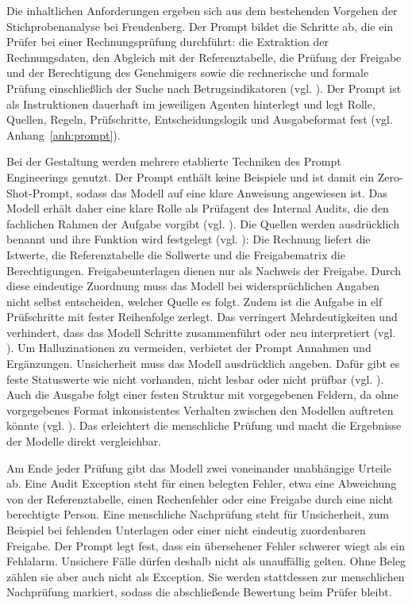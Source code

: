 Die inhaltlichen Anforderungen ergeben sich aus dem bestehenden Vorgehen der Stichprobenanalyse bei Freudenberg. Der Prompt bildet die Schritte ab, die ein Prüfer bei einer Rechnungsprüfung durchführt: die Extraktion der Rechnungsdaten, den Abgleich mit der Referenztabelle, die Prüfung der Freigabe und der Berechtigung des Genehmigers sowie die rechnerische und formale Prüfung einschließlich der Suche nach Betrugsindikatoren (vgl. \cite{freudenberg2026auditsample}). Der Prompt ist als Instruktionen dauerhaft im jeweiligen Agenten hinterlegt und legt Rolle, Quellen, Regeln, Prüfschritte, Entscheidungslogik und Ausgabeformat fest (vgl. Anhang~\ref{anh:prompt}).

Bei der Gestaltung werden mehrere etablierte Techniken des Prompt Engineerings genutzt. Der Prompt enthält keine Beispiele und ist damit ein Zero-Shot-Prompt, sodass das Modell auf eine klare Anweisung angewiesen ist. Das Modell erhält daher eine klare Rolle als Prüfagent des Internal Audits, die den fachlichen Rahmen der Aufgabe vorgibt (vgl. \cite{microsoft2026declarative}). Die Quellen werden ausdrücklich benannt und ihre Funktion wird festgelegt (vgl. \cite{microsoft2026declarative}): Die Rechnung liefert die Istwerte, die Referenztabelle die Sollwerte und die Freigabematrix die Berechtigungen. Freigabeunterlagen dienen nur als Nachweis der Freigabe. Durch diese eindeutige Zuordnung muss das Modell bei widersprüchlichen Angaben nicht selbst entscheiden, welcher Quelle es folgt. Zudem ist die Aufgabe in elf Prüfschritte mit fester Reihenfolge zerlegt. Das verringert Mehrdeutigkeiten und verhindert, dass das Modell Schritte zusammenführt oder neu interpretiert (vgl. \cite{microsoft2026declarative}).
Um Halluzinationen zu vermeiden, verbietet der Prompt Annahmen und Ergänzungen. Unsicherheit muss das Modell ausdrücklich angeben. Dafür gibt es feste Statuswerte wie nicht vorhanden, nicht lesbar oder nicht prüfbar (vgl. \cite{anthropic2026hallucinations}). Auch die Ausgabe folgt einer festen Struktur mit vorgegebenen Feldern, da ohne vorgegebenes Format inkonsistentes Verhalten zwischen den Modellen auftreten könnte (vgl. \cite{microsoft2026declarative}). Das erleichtert die menschliche Prüfung und macht die Ergebnisse der Modelle direkt vergleichbar.

Am Ende jeder Prüfung gibt das Modell zwei voneinander unabhängige Urteile ab. Eine Audit Exception steht für einen belegten Fehler, etwa eine Abweichung von der Referenztabelle, einen Rechenfehler oder eine Freigabe durch eine nicht berechtigte Person. Eine menschliche Nachprüfung steht für Unsicherheit, zum Beispiel bei fehlenden Unterlagen oder einer nicht eindeutig zuordenbaren Freigabe. Der Prompt legt fest, dass ein übersehener Fehler schwerer wiegt als ein Fehlalarm. Unsichere Fälle dürfen deshalb nicht als unauffällig gelten. Ohne Beleg zählen sie aber auch nicht als Exception. Sie werden stattdessen zur menschlichen Nachprüfung markiert, sodass die abschließende Bewertung beim Prüfer bleibt.

